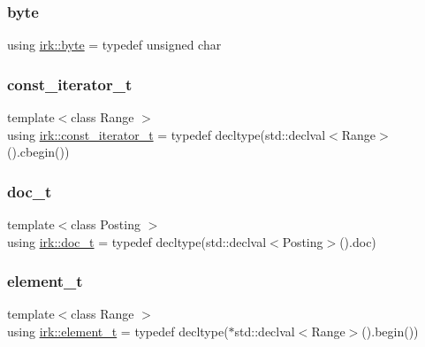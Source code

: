 \subsubsection{\texorpdfstring{byte}{byte}}
{\footnotesize\ttfamily using \mbox{\hyperlink{namespaceirk_a332c28497c23c3702c56f3c1c100d028}{irk\+::byte}} = typedef unsigned char}

\mbox{\label{namespaceirk_a90f7893fdbf95c6dcc2302148eb0bddb}} 
\subsubsection{\texorpdfstring{const\+\_\+iterator\+\_\+t}{const\_iterator\_t}}
{\footnotesize\ttfamily template$<$class Range $>$ \\
using \mbox{\hyperlink{namespaceirk_a90f7893fdbf95c6dcc2302148eb0bddb}{irk\+::const\+\_\+iterator\+\_\+t}} = typedef decltype(std\+::declval$<$Range$>$().cbegin())}

\mbox{\label{namespaceirk_af5d95ec091f3bd711790e71ccb533903}} 
\subsubsection{\texorpdfstring{doc\+\_\+t}{doc\_t}}
{\footnotesize\ttfamily template$<$class Posting $>$ \\
using \mbox{\hyperlink{namespaceirk_af5d95ec091f3bd711790e71ccb533903}{irk\+::doc\+\_\+t}} = typedef decltype(std\+::declval$<$Posting$>$().doc)}

\mbox{\label{namespaceirk_a44ec708d671914dae1d40355ac05c280}} 
\subsubsection{\texorpdfstring{element\+\_\+t}{element\_t}}
{\footnotesize\ttfamily template$<$class Range $>$ \\
using \mbox{\hyperlink{namespaceirk_a44ec708d671914dae1d40355ac05c280}{irk\+::element\+\_\+t}} = typedef decltype($\ast$std\+::declval$<$Range$>$().begin())}




